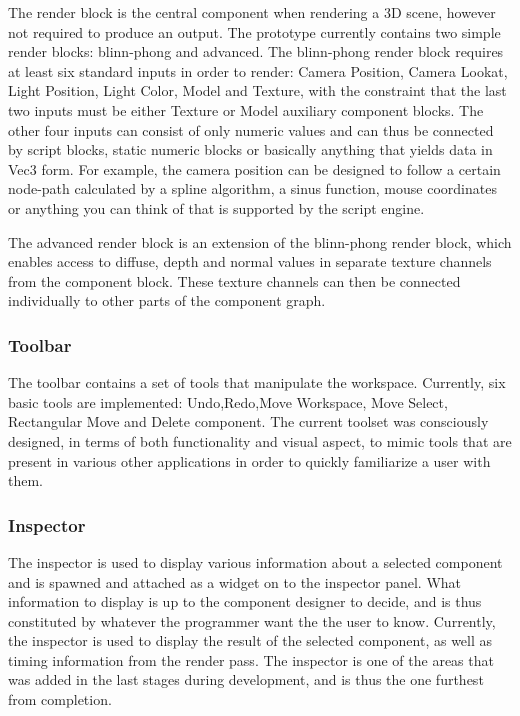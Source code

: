 The render block is the central component when rendering a 3D scene, however not required to produce an output. The prototype currently contains two simple render blocks: blinn-phong and advanced. The blinn-phong render block requires at least six standard inputs in order to render: Camera Position, Camera Lookat, Light Position, Light Color, Model and Texture, with the constraint that the last two inputs must be either Texture or Model auxiliary component blocks. The other four inputs can consist of only numeric values and can thus be connected by script blocks, static numeric blocks or basically anything that yields data in Vec3 form. For example, the camera position can be designed to follow a certain node-path calculated by a spline algorithm, a sinus function, mouse coordinates or anything you can think of that is supported by the script engine. 

The advanced render block is an extension of the blinn-phong render block, which enables access to diffuse, depth and normal values in separate texture channels from the component block. These texture channels can then be connected individually to other parts of the component graph. 

\subsubsection{Toolbar}
The toolbar contains a set of tools that manipulate the workspace. Currently, six basic tools are implemented: Undo,Redo,Move Workspace, Move Select, Rectangular Move and Delete component. The current toolset was consciously designed, in terms of both functionality and visual aspect, to mimic tools that are present in various other applications in order to quickly familiarize a user with them.

\subsubsection{Inspector}
The inspector is used to display various information about a selected component and is spawned and attached as a widget on to the inspector panel. What information to display is up to the component designer to decide, and is thus constituted by whatever the programmer want the the user to know. Currently, the inspector is used to display the result of the selected component, as well as timing information from the render pass. The inspector is one of the areas that was added in the last stages during development, and is thus the one furthest from completion. 

